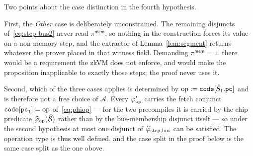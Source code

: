 \begin{remark}\label{rem:mem-ext-hyp4}
Two points about the case distinction in the fourth hypothesis.

First, the \emph{Other} case is deliberately unconstrained.  The remaining
disjuncts of~\eqref{eq:step-bus2} never read $\pi^{\mathsf{mem}}$, so nothing in
the construction forces its value on a non-memory step, and the extractor of
Lemma~\ref{lem:segment} returns whatever the prover placed in that witness
field.  Demanding $\pi^{\mathsf{mem}}=\bot$ there would be a requirement the
zkVM does not enforce, and would make the proposition inapplicable to exactly
those steps; the proof never uses it.

Second, which of the three cases applies is determined by
$\mathrm{op}:=\mathtt{code}[\hat{S}_1.\mathtt{pc}]$ and is therefore not a free choice of
$\mathcal{A}$.  Every $\varphi'_{\mathrm{op}}$ carries the fetch conjunct
$\mathtt{code}[\mathtt{pc}_1]=\mathrm{op}$ of~\eqref{eq:phiop} --- for the two precompiles it is carried
by the chip predicate $\widehat{\varphi}_{\mathrm{op}}(\widehat{\mathcal{B}})$ rather than by
the bus-membership disjunct itself --- so under the second hypothesis at most
one disjunct of $\widehat{\varphi}_{\mathrm{step},\mathrm{bus}}$ can be satisfied.  The
operation type is thus well defined, and the case split in the proof below is
the same case split as the one above.
\end{remark}

